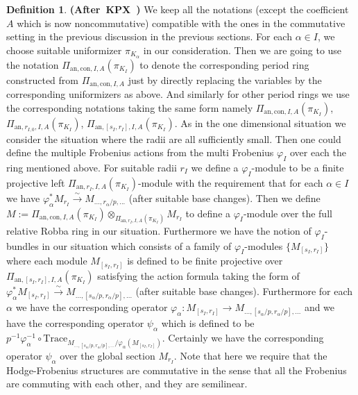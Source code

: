 \documentclass[12pt]{amsart}
\theoremstyle{definition}
\newtheorem{definition}[theorem]{Definition}
\numberwithin{equation}{section}
\begin{document}
\begin{definition} \mbox{\bf{(After KPX \cite[Definition 2.2.2]{KPX})}}
We keep all the notations (except the coefficient $A$ which is now noncommutative) compatible with the ones in the commutative setting in the previous discussion in the previous sections. For each $\alpha\in I$, we choose suitable uniformizer $\pi_{K_\alpha}$ in our consideration. Then we are going to use the notation $\Pi_{\mathrm{an},\mathrm{con},I,A}(\pi_{K_I})$ to denote the corresponding period ring constructed from $\Pi_{\mathrm{an},\mathrm{con},I,A}$ just by directly replacing the variables by the corresponding uniformizers as above. And similarly for other period rings we use the corresponding notations taking the same form namely $\Pi_{\mathrm{an},\mathrm{con},I,A}(\pi_{K_I})$, $\Pi_{\mathrm{an},r_{I,0},I,A}(\pi_{K_I})$, $\Pi_{\mathrm{an},[s_I,r_I],I,A}(\pi_{K_I})$. As in the one dimensional situation we consider the situation where the radii are all sufficiently small. Then one could define the multiple Frobenius actions from the multi Frobenius $\varphi_I$ over each the ring mentioned above. For suitable radii $r_I$ we define a $\varphi_I$-module to be a finite projective left $\Pi_{\mathrm{an},r_{I},I,A}(\pi_{K_I})$-module with the requirement that for each $\alpha\in I$ we have $\varphi_\alpha^*M_{r_I}\overset{\sim}{\rightarrow}M_{...,r_\alpha/p,...}$ (after suitable base changes). Then we define $M:=\Pi_{\mathrm{an},\mathrm{con},I,A}(\pi_{K_I})\otimes_{\Pi_{\mathrm{an},r_{I},I,A}(\pi_{K_I})}M_{r_I}$ to define a $\varphi_I$-module over the full relative Robba ring in our situation. Furthermore we have the notion of $\varphi_I$-bundles in our situation which consists of a family of $\varphi_I$-modules $\{M_{[s_I,r_I]}\}$ where each module $M_{[s_I,r_I]}$ is defined to be finite projective over $\Pi_{\mathrm{an},[s_I,r_I],I,A}(\pi_{K_I})$ satisfying the action formula taking the form of $\varphi_\alpha^*M_{[s_I,r_I]}\overset{\sim}{\rightarrow}M_{...,[s_\alpha/p,r_\alpha/p],...}$ (after suitable base changes). Furthermore for each $\alpha$ we have the corresponding operator $\varphi_\alpha:M_{[s_I,r_I]}\rightarrow M_{...,[s_\alpha/p,r_\alpha/p],...}$ and we have the corresponding operator $\psi_\alpha$ which is defined to be $p^{-1}\varphi_\alpha^{-1}\circ\mathrm{Trace}_{M_{...,[s_\alpha/p,r_\alpha/p],...}/\varphi_\alpha(M_{[s_I,r_I]})}$. Certainly we have the corresponding operator $\psi_\alpha$ over the global section $M_{r_I}$. Note that here we require that the Hodge-Frobenius structures are commutative in the sense that all the Frobenius are commuting with each other, and they are semilinear.
\end{definition}
\end{document}
